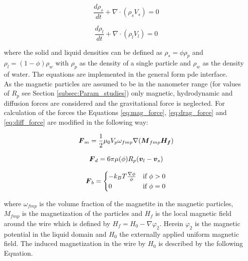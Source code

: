 \begin{equation}
\frac{d\rho_{s}}{d t}+\nabla\cdotp(\rho_{s}V_{s})=0
\label{eq:Conti_p}
\end{equation}

\begin{equation}
\frac{d\rho_{l}}{d t}+\nabla\cdotp(\rho_{l}V_{l})=0
\label{eq:Conti_l}
\end{equation}

where the solid and liquid densities can be defined as $\rho_{s}=\phi\rho_{p}$ and $\rho_{l}=(1-\phi)\rho_{w}$ with $\rho_{p}$ as the density of a single particle and $\rho_{w}$ as the density of water. The equations are implemented in the general form \gls{pde} interface.\\
As the magnetic particles are assumed to be in the nanometer range (for values of $R_{p}$ see Section \ref{subsec:Param_studies}) only magnetic, hydrodynamic and diffusion forces are considered and the gravitational force is neglected. For calculation of the forces the Equations \ref{eq:mag_force}, \ref{eq:drag_force} and \ref{eq:diff_force} are modified in the following way:  

\begin{equation}
\label{eq:mag_force_model}
\centering
\boldsymbol{F}_{m} = \frac{1}{2}\mu_{0}V_{p}\omega_{fmp}\nabla(\boldsymbol{M}_{fmp}\boldsymbol{H_{f}})
\end{equation}

\begin{equation}
\label{eq:drag_force_model}
\centering
\boldsymbol{F}_{d} = 6\pi\mu(\phi)R_{p}(\boldsymbol{v}_{l}-\boldsymbol{v}_{s})
\end{equation}

\begin{equation}
\label{eq:diff_force_model}
\centering
\boldsymbol{F}_{b}= 
                 \begin{cases}
                    -k_{B}T\frac{\nabla\phi}{\phi} & \text{if}\ \phi>0 \\
                    0 & \text{if}\ \phi=0
                 \end{cases}
\end{equation}

where $\omega_{fmp}$ is the volume fraction of the magnetite in the magnetic particles, $M_{fmp}$ is the magnetization of the particles and $H_{f}$ is the local magnetic field around the wire which is defined by $H_{f}=H_{0}-\nabla\varphi_{2}$. Herein $\varphi_{2}$ is the magnetic potential in the liquid domain and $H_{0}$ the externally applied uniform magnetic field. The induced magnetization in the wire  by $H_{0}$ is described by the following Equation.


